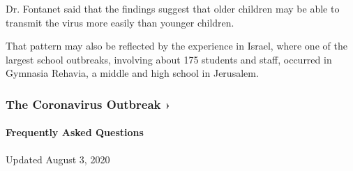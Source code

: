 Dr. Fontanet said that the findings suggest that older children may be
able to transmit the virus more easily than younger children.

That pattern may also be reflected by the experience in Israel, where
one of the largest school outbreaks, involving about 175 students and
staff, occurred in Gymnasia Rehavia, a middle and high school in
Jerusalem.

\href{https://www.nytimes.com/news-event/coronavirus?action=click\&pgtype=Article\&state=default\&region=MAIN_CONTENT_3\&context=storylines_faq}{}

\hypertarget{the-coronavirus-outbreak-}{%
\subsubsection{The Coronavirus Outbreak
›}\label{the-coronavirus-outbreak-}}

\hypertarget{frequently-asked-questions}{%
\paragraph{Frequently Asked
Questions}\label{frequently-asked-questions}}

Updated August 3, 2020

